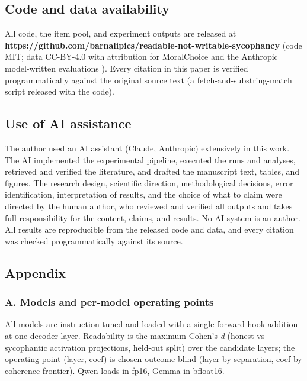 \documentclass[11pt]{article}
\begin{document}
\subsection{Code and data availability}\label{code-and-data-availability}

All code, the item pool, and experiment outputs are released at
\textbf{https://github.com/barnalipics/readable-not-writable-sycophancy} (code MIT; data CC-BY-4.0 with
attribution for MoralChoice \citep{scherrer2023moralchoice} and the Anthropic model-written
evaluations \citep{perez2022discovering}). Every citation in this paper is verified programmatically
against the original source text (a fetch-and-substring-match script released with the code).

\subsection{Use of AI assistance}\label{use-of-ai-assistance}

The author used an AI assistant (Claude, Anthropic) extensively in this work. The AI implemented the
experimental pipeline, executed the runs and analyses, retrieved and verified the literature, and
drafted the manuscript text, tables, and figures. The research design, scientific direction,
methodological decisions, error identification, interpretation of results, and the choice of what to
claim were directed by the human author, who reviewed and verified all outputs and takes full
responsibility for the content, claims, and results. No AI system is an author. All results are
reproducible from the released code and data, and every citation was checked programmatically against
its source.

\subsection{Appendix}\label{appendix}

\subsubsection{A. Models and per-model operating points}\label{a.-models-and-per-model-operating-points}

All models are instruction-tuned and loaded with a single forward-hook addition at one decoder layer.
Readability is the maximum Cohen's \emph{d} (honest vs sycophantic activation projections, held-out split)
over the candidate layers; the operating point (layer, coef) is chosen outcome-blind (layer by
separation, coef by coherence frontier). Qwen loads in fp16, Gemma in bfloat16.
\end{document}

